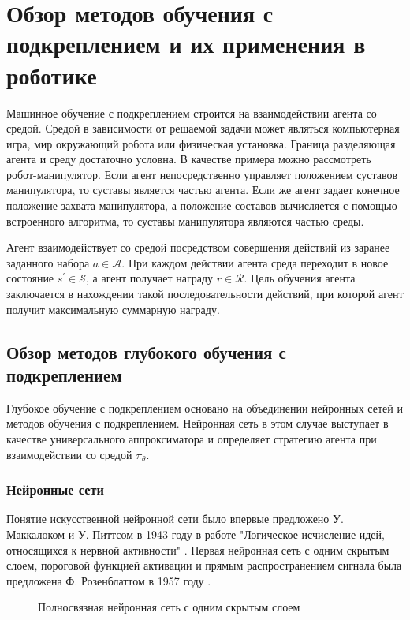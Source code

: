 \chapter{Обзор методов обучения с подкреплением и их применения в роботике}\label{ch:ch1}

Машинное обучение с подкреплением строится на взаимодействии агента со средой. Средой в зависимости от решаемой задачи может являться компьютерная игра, мир окружающий робота или физическая установка. Граница разделяющая агента и среду достаточно условна. В качестве примера можно рассмотреть робот-манипулятор. Если агент непосредственно управляет положением суставов манипулятора, то суставы является частью агента. Если же агент задает конечное положение захвата манипулятора, а положение составов вычисляется с помощью встроенного алгоритма, то суставы манипулятора являются частью среды. 

Агент взаимодействует со средой посредством совершения  действий из заранее заданного набора $a \in \mathcal{A}$. При каждом действии агента среда переходит в новое состояние $s^{\prime} \in \mathcal{S}$, а агент получает награду $r \in \mathcal{R}$.
Цель обучения агента заключается в нахождении такой последовательности действий, при которой агент получит максимальную суммарную награду.

\section{Обзор методов глубокого обучения с подкреплением}\label{sec:ch1/sec1}

Глубокое обучение с подкреплением основано на объединении нейронных сетей и методов обучения с подкреплением. Нейронная сеть в этом случае выступает в качестве универсального аппроксиматора и определяет стратегию агента при взаимодействии со средой $\pi_{\theta}$.

\subsection{Нейронные сети}

Понятие искусственной нейронной сети было впервые предложено У. Маккалоком и У. Питтсом в 1943 году в работе "Логическое исчисление идей, относящихся к нервной активности" \cite{McCulloch1943}. Первая нейронная сеть с одним скрытым слоем, пороговой функцией активации и прямым распространением сигнала была предложена Ф. Розенблаттом в 1957 году \cite{rosenblatt}.

\begin{figure}[ht]
	\caption{Полносвязная нейронная сеть с одним скрытым слоем}
	\label{fig:fcnn}
\end{figure}

